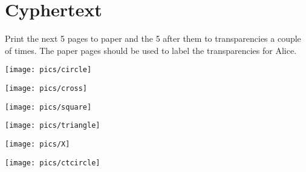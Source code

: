 \documentclass[a4paper,10pt]{article}
\begin{document}
\newpage

\section{Cyphertext}

Print the next 5 pages to paper and the 5 after them to transparencies a couple of times. The paper pages should be used to label the transparencies for Alice.



\newpage
\label{pg_circle}

\phantom{a}
\begin{center}
\vspace{4cm}
\texttt{[image: pics/circle]}
\end{center}

\newpage
\label{pg_cross}

\phantom{a}
\begin{center}
\vspace{4cm}
\texttt{[image: pics/cross]}
\end{center}

\newpage
\label{pg_square}

\phantom{a}
\begin{center}
\vspace{4cm}
\texttt{[image: pics/square]}
\end{center}

\newpage
\label{pg_triangle}


\phantom{a}
\begin{center}
\vspace{4cm}
\texttt{[image: pics/triangle]}
\end{center}


\newpage
\label{pg_X}
\label{pg_last_paper_printed}

\phantom{a}
\begin{center}
\vspace{4cm}
\texttt{[image: pics/X]}
\end{center}



\newpage
\thispagestyle{empty}


\phantom{a}
\begin{center}
\vspace{4cm}
\texttt{[image: pics/ctcircle]}
\end{center}

\newpage
\thispagestyle{empty}
\end{document}
